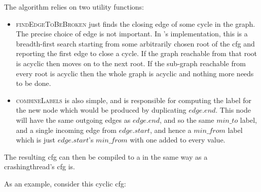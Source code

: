 \newpage
The algorithm relies on two utility functions:
\begin{itemize}
\item \textsc{findEdgeToBeBroken} just finds the closing edge of some
  cycle in the graph.  The precise choice of edge is not
  important.  In {\implementation}'s implementation, this is a
  breadth-first search starting from some arbitrarily chosen root of
  the \gls{cfg} and reporting the first edge to close a cycle.  If the graph
  reachable from that root is acyclic then {\implementation} moves on
  to the next root.  If the sub-graph reachable from every root is
  acyclic then the whole graph is acyclic and nothing more needs to be
  done.
\item \textsc{combineLabels} is also simple, and is responsible for
  computing the label for the new node which would be produced by
  duplicating $\mathit{edge}.\mathit{end}$.  This node will have the
  same outgoing edges as $\mathit{edge}.\mathit{end}$, and so the same
  $min\_to$ label, and a single incoming edge from
  $\mathit{edge}.\mathit{start}$, and hence a $\mathit{min\_from}$
  label which is just $\mathit{edge}.\mathit{start}$'s
  $\mathit{min\_from}$ with one added to every value.
\end{itemize}
The resulting \gls{cfg} can then be compiled to a {\StateMachine} in
the same way as a \gls{crashingthread}'s \gls{cfg} is.

As an example, consider this cyclic \gls{cfg}:


